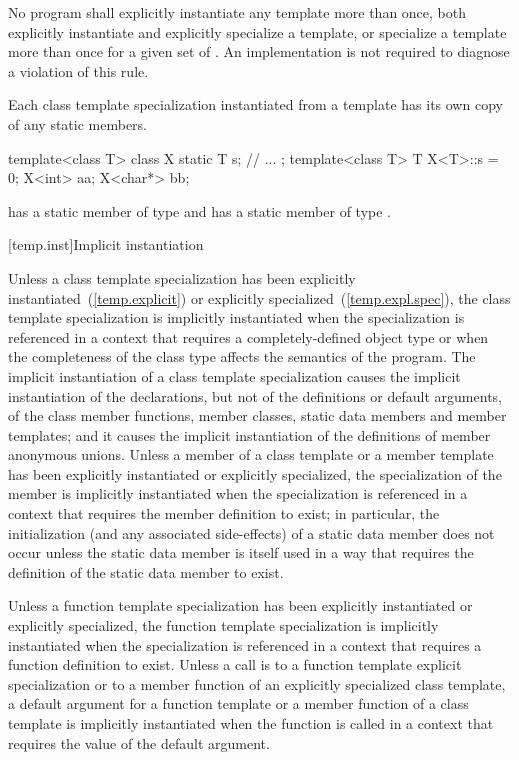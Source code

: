 \pnum
No program shall explicitly instantiate any template more than once,
both explicitly instantiate and explicitly specialize a template, or
specialize a template more than once for a given set of
. An implementation is not required
to diagnose a violation of this rule.

\pnum
Each class template specialization instantiated from a template has its own
copy of any static members.
\enterexample

\begin{codeblock}
template<class T> class X {
	static T s;
	// ...
};
template<class T> T X<T>::s = 0;
X<int> aa;
X<char*> bb;
\end{codeblock}

has a static member
of type
and
has a static member
of type
.
\exitexample

[temp.inst]{Implicit instantiation}

\pnum
{}%
Unless a class template specialization has been explicitly
instantiated~(\ref{temp.explicit}) or explicitly
specialized~(\ref{temp.expl.spec}),
the class template specialization is implicitly instantiated when the
specialization is referenced in a context that requires a completely-defined
object type or when the completeness of the class type affects the semantics
of the program.
The implicit instantiation of a class template specialization causes
the implicit instantiation of the declarations, but not of the definitions or
default arguments, of the class member functions,
member classes, static data members and member templates; and it causes the
implicit instantiation of the definitions of member anonymous unions.
Unless a member of a class template or a member template has been explicitly
instantiated or explicitly specialized,
the specialization of the member is implicitly instantiated when the
specialization is referenced in a context that requires the member definition
to exist;
in particular, the initialization (and any associated side-effects) of a
static data member does not occur unless the static data member is itself used
in a way that requires the definition of the static data member to exist.

\pnum
Unless a function template specialization has been explicitly instantiated or
explicitly specialized,
the function template specialization is implicitly instantiated when the
specialization is referenced in a context that requires a function definition
to exist.
Unless a call is to a function template explicit specialization or
to a member function of an explicitly specialized class template,
a default argument for a function template or a member function of a
class template is implicitly instantiated when the function is
called in a context that requires the value of the default argument.

